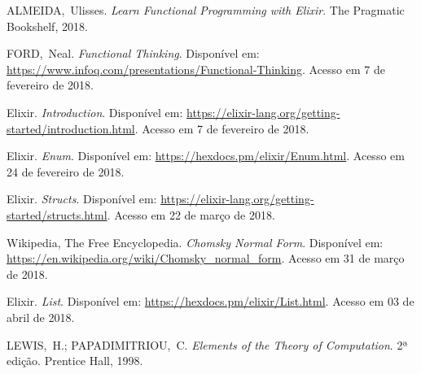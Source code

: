 \documentclass[journal,transmag]{IEEEtran}
\begin{document}
%
%
%
\begin{thebibliography}{1}
  
  ALMEIDA,~Ulisses.
  \emph{Learn Functional Programming with Elixir}.
  The Pragmatic Bookshelf, 2018.
  
  FORD,~Neal.
  \emph{Functional Thinking}.
  Disponível em: \url{https://www.infoq.com/presentations/Functional-Thinking}.
  Acesso em 7 de fevereiro de 2018.
  
  Elixir.
  \emph{Introduction}.
  Disponível em: \url{https://elixir-lang.org/getting-started/introduction.html}.
  Acesso em 7 de fevereiro de 2018.
  
  Elixir.
  \emph{Enum}.
  Disponível em: \url{https://hexdocs.pm/elixir/Enum.html}.
  Acesso em 24 de fevereiro de 2018.
  
  Elixir.
  \emph{Structs}.
  Disponível em: \url{https://elixir-lang.org/getting-started/structs.html}.
  Acesso em 22 de março de 2018.

  Wikipedia, The Free Encyclopedia.
  \emph{Chomsky Normal Form}.
  Disponível em: \url{https://en.wikipedia.org/wiki/Chomsky_normal_form}.
  Acesso em 31 de março de 2018.

  Elixir.
  \emph{List}.
  Disponível em: \url{https://hexdocs.pm/elixir/List.html}.
  Acesso em 03 de abril de 2018.

  LEWIS,~H.; PAPADIMITRIOU,~C.
  \emph{Elements of the Theory of Computation}.
  2ª edição. Prentice Hall, 1998.

  
\end{thebibliography}
  
% 
\end{document}
